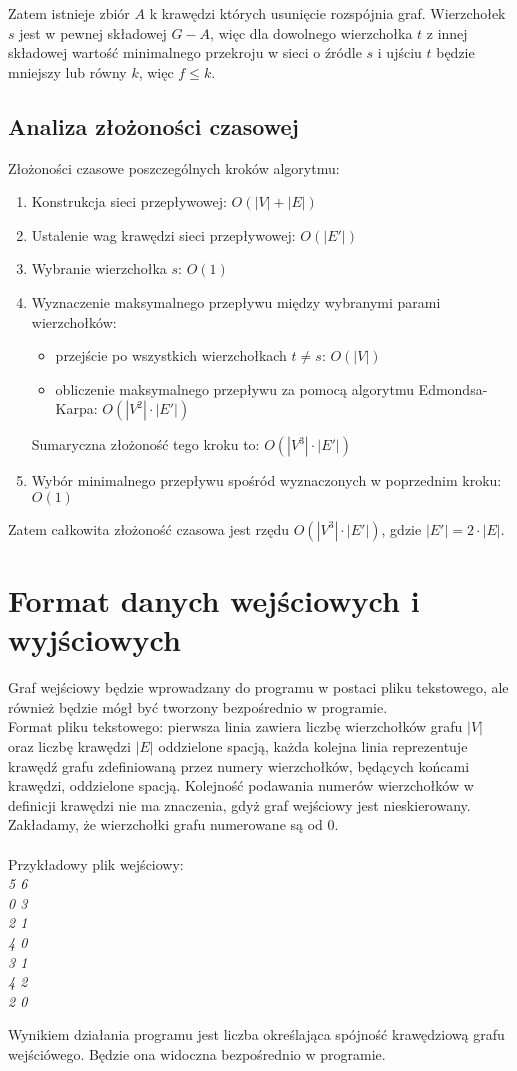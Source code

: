 \documentclass{article}
\begin{document}
Zatem istnieje zbiór $A$ k krawędzi których usunięcie rozspójnia graf. Wierzchołek $s$ jest w pewnej składowej $G-A$, więc dla dowolnego wierzchołka $t$ z innej składowej wartość minimalnego przekroju w sieci o źródle $s$ i ujściu $t$ będzie mniejszy lub równy $k$, więc $f \le k$.


\subsection{Analiza złożoności czasowej}


Złożoności czasowe poszczególnych kroków algorytmu: 
\begin{enumerate}
\item Konstrukcja sieci przepływowej: $O(|V|+|E|)$
\item Ustalenie wag krawędzi sieci przepływowej: $O(|E'|)$
\item Wybranie wierzchołka $s$: $O(1)$
\item Wyznaczenie maksymalnego przepływu między wybranymi parami wierzchołków: 
\begin{itemize}
    \item przejście po wszystkich wierzchołkach $t \neq s$: $O(|V|)$
    \item obliczenie maksymalnego przepływu za pomocą algorytmu Edmondsa-Karpa: $O(|V^{2}|\cdot|E'|)$
\end{itemize}
Sumaryczna złożoność tego kroku to: $O(|V^{3}|\cdot|E'|)$
\item Wybór minimalnego przepływu spośród wyznaczonych w poprzednim kroku: $O(1)$
\end{enumerate}
Zatem całkowita złożoność czasowa jest rzędu $O(|V^{3}|\cdot|E'|)$, gdzie $|E'|=2\cdot |E|$.\\


\section{Format danych wejściowych i wyjściowych}
Graf wejściowy będzie wprowadzany do programu w postaci pliku tekstowego, ale również będzie mógł być tworzony bezpośrednio w programie.\\

Format pliku tekstowego: pierwsza linia zawiera liczbę wierzchołków grafu $|V|$ oraz liczbę krawędzi $|E|$ oddzielone spacją, każda kolejna linia reprezentuje krawędź grafu zdefiniowaną przez numery wierzchołków, będących końcami krawędzi, oddzielone spacją. Kolejność podawania numerów wierzchołków w definicji krawędzi nie ma znaczenia, gdyż graf wejściowy jest nieskierowany. Zakładamy, że wierzchołki grafu numerowane są od 0.
\\\\
Przykładowy plik wejściowy:\\
\textit{5 6\\
0 3\\
2 1\\
4 0\\
3 1\\
4 2\\
2 0\\
}


Wynikiem działania programu jest liczba określająca spójność krawędziową grafu wejściówego. Będzie ona widoczna bezpośrednio w programie.
\end{document}
